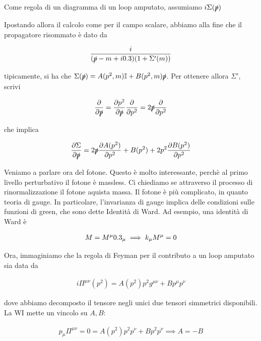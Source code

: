 \documentclass[11pt]{report}
\begin{document}
Come regola di un diagramma di un loop amputato, assumiamo \(i\Sigma(\slashed{p})\)

Ipostando allora il calcolo come per il campo scalare, abbiamo alla fine che il propagatore risommato è dato da 

\begin{align}
    \frac{i}{(\slashed{p}-m+i0.3)(1+\Sigma'(m))}
\end{align}

tipicamente, si ha che \(\Sigma(\slashed{p}) = A(p^2, m)\mathbb{I} + B(p^2, m)\slashed{p}\). Per ottenere allora \(\Sigma'\), scrivi 

\begin{align}
    \frac{\partial}{\partial \slashed{p}} = \frac{\partial p^2}{\partial \slashed{p}}\frac{\partial}{\partial p^2} = 2\slashed{p}\frac{\partial}{\partial p^2}
\end{align}

che implica

\begin{align}
    \frac{\partial \Sigma}{\partial \slashed{p}} = 2\slashed{p}\frac{\partial A(p^2)}{\partial p^2} + B(p^2) + 2p^2 \frac{\partial B(p^2)}{\partial p^2}
\end{align}

Veniamo a parlare ora del fotone. Questo è molto interessante, perchè al primo livello perturbativo il fotone è massless. Ci chiediamo se attraverso il processo di rinormalizzazione il fotone aquista massa. Il fotone è più complicato, in quanto teoria di gauge. In particolare, l'invarianza di gauge implica delle condizioni sulle funzioni di green, che sono dette Identità di Ward. Ad esempio, una identità di Ward è 

\begin{align}
    M = M^\mu 0.3_\mu \implies k_\mu M^\mu = 0 
\end{align}

Ora, immaginiamo che la regola di Feyman per il contributo a un loop amputato sia data da 

\begin{align}
    i \Pi^{\mu\nu}(p^2) = A(p^2)p^2g^{\mu\nu} + B p^\mu p^\nu
\end{align}

dove abbiamo decomposto il tensore negli unici due tensori simmetrici disponibili. La WI mette un vincolo su \(A, B\): 

\begin{align}
    p_\mu \Pi^{\mu\nu} = 0 = A(p^2)p^2p^\nu + B p^2 p^\nu \implies A = -B 
\end{align}
\end{document}
